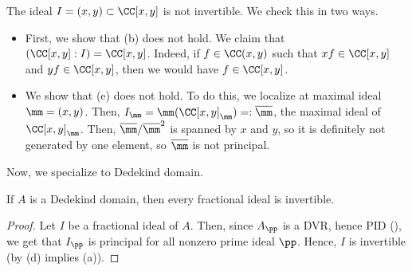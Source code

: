 \begin{example}
    The ideal $I=(x,y)\subset \CC[x,y]$ is not invertible.
    We check this in two ways.
    \begin{itemize}
    \item First, we show that (b) does not hold.
    We claim that $(\CC[x,y] : I) = \CC[x,y]$.
    Indeed, if $f\in \CC(x,y)$ such that $xf\in \CC[x,y]$
    and $yf\in\CC[x,y]$, then we would have $f\in\CC[x,y]$.
    \item We show that (e) does not hold. To do this,
    we localize at maximal ideal $\mm = (x,y)$. 
    Then, $I_\mm = \mm(\CC[x,y]_\mm) =: \overline\mm$, 
    the maximal ideal of $\CC[x,y]_\mm$. 
    Then, $\overline\mm / \overline\mm^2$ is spanned by 
    $x$ and $y$, so it is definitely not generated by one element,
    so $\overline\mm$ is not principal.
    \end{itemize}
\end{example}
Now, we specialize to Dedekind domain.
\begin{theorem}
    \label{thm:frac_ideal_dedekind}
    If $A$ is a Dedekind domain, then
    every fractional ideal is invertible.
\end{theorem}
\begin{proof}
    Let $I$ be a fractional ideal of $A$.
    Then, since $A_\pp$ is a DVR, hence PID
    (), we get that $I_\pp$ is principal
    for all nonzero prime ideal $\pp$.
    Hence, $I$ is invertible (by 
    (d) implies (a)).
\end{proof}

